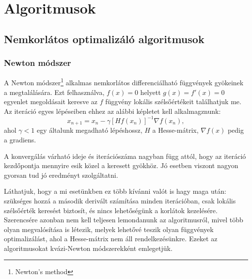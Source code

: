 \chapter{Algoritmusok}
\label{sec:algoritmusok}

\section{Nemkorlátos optimalizáló algoritmusok}

\subsection{Newton módszer}
A Newton módszer\footnote{Newton's method} alkalmas nemkorlátos differenciálható függvények gyökeinek a megtalálására. Ezt felhasználva, $f(x)=0$ helyett $g(x)=f'(x)=0$ egyenlet megoldásait keresve az $f$ függvény lokális szélsőértékeit találhatjuk me. Az iteráció egyes lépéseiben ehhez az alábbi képletet kell alkalmagznunk:
$$x_{n+1}=x_n-\gamma[Hf(x_n)]^{-1}\nabla f(x_n),$$ 
ahol $\gamma<1$ egy általunk megadható lépéshossz, $H$ a Hesse-mátrix, $\nabla f(x)$ pedig a gradiens.

A konvergálás várható ideje és iterációszáma nagyban függ attól, hogy az iteráció kezdőpontja mennyire esik közel a keresett gyökhöz. Jó esetben viszont nagyon gyorsan tud jó eredményt szolgáltatni.

Láthatjuk, hogy a mi esetünkben ez több kívánni valót is hagy maga után: szükséges hozzá a második derivált számítása minden iterációban, csak lokális szélsőérték keresést biztosít, és nincs lehetőségünk a korlátok kezelésére. Szerencsére azonban nem kell teljesen lemondanunk az algoritmusról, mivel több olyan megvalósítása is létezik, melyek lehetővé teszik olyan függvények optimalizálást, ahol a Hesse-mátrix nem áll rendelkezésünkre. Ezeket az algoritmusokat kvázi-Newton módszerekként emlegetjük.

